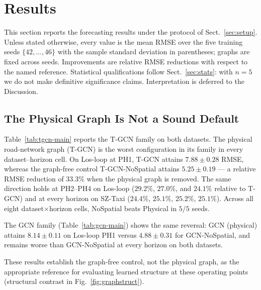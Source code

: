 \section{Results}\label{sec:results}

This section reports the forecasting results under the protocol of
Sect.~\ref{sec:setup}. Unless stated otherwise, every value is the mean RMSE
over the five training seeds $\{42,\dots,46\}$ with the sample standard
deviation in parentheses; graphs are fixed across seeds. Improvements are
relative RMSE reductions with respect to the named reference. Statistical
qualifications follow Sect.~\ref{sec:stats}: with $n=5$ we do not make
definitive significance claims. Interpretation is deferred to the Discussion.

\subsection{The Physical Graph Is Not a Sound Default}\label{sec:res-physical}

Table~\ref{tab:tgcn-main} reports the T-GCN family on both datasets. The
physical road-network graph (T-GCN) is the worst configuration in its family
in every dataset--horizon cell. On Los-loop at PH1, T-GCN attains
$7.88\pm 0.28$ RMSE, whereas the graph-free control T-GCN-NoSpatial attains
$5.25\pm 0.19$ --- a relative RMSE reduction of $33.3\%$ when the physical
graph is removed. The same direction holds at PH2--PH4 on Los-loop
($29.2\%$, $27.0\%$, and $24.1\%$ relative to T-GCN) and at every horizon on
SZ-Taxi ($24.4\%$, $25.1\%$, $25.2\%$, $25.1\%$). Across all eight
dataset$\times$horizon cells, NoSpatial beats Physical in $5/5$ seeds.

The GCN family (Table~\ref{tab:gcn-main}) shows the same reversal: GCN
(physical) attains $8.14\pm 0.11$ on Los-loop PH1 versus $4.88\pm 0.31$ for
GCN-NoSpatial, and remains worse than GCN-NoSpatial at every horizon on both
datasets.

These results establish the graph-free control, not the physical graph, as
the appropriate reference for evaluating learned structure at these operating
points (structural contrast in Fig.~\ref{fig:graphstruct}).

